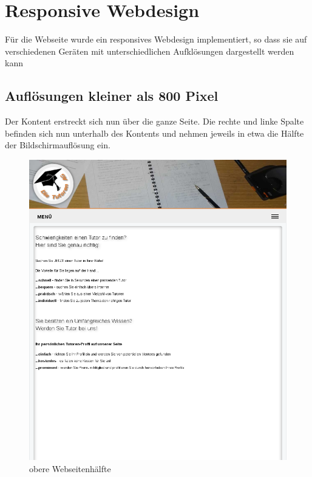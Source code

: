 
\section{Responsive Webdesign}

Für die Webseite wurde ein responsives Webdesign implementiert, so dass sie auf verschiedenen Geräten mit unterschiedlichen Aufklösungen dargestellt werden kann 

\subsection{Auflösungen kleiner als 800 Pixel}
Der Kontent erstreckt sich nun über die ganze Seite. Die rechte und linke Spalte befinden sich nun unterhalb des Kontents und nehmen jeweils in etwa die Hälfte der Bildschirmauflösung ein.

\begin{figure}[!htbp]
\centering
\includegraphics[width=1\linewidth]{../Screenshots/responsive8001}
\caption{obere Webseitenhälfte}
\label{fig:responsive8001}
\end{figure}

